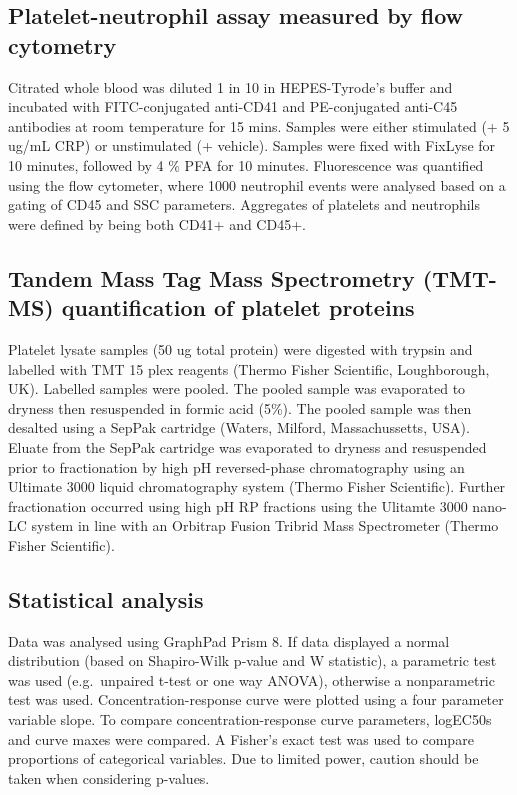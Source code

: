\documentclass[11pt,twoside]{bristolthesis}
\begin{document}
\hypertarget{platelet-neutrophil-assay-measured-by-flow-cytometry}{%
\subsection{Platelet-neutrophil assay measured by flow cytometry}\label{platelet-neutrophil-assay-measured-by-flow-cytometry}}

Citrated whole blood was diluted 1 in 10 in HEPES-Tyrode's buffer and incubated with FITC-conjugated anti-CD41 and PE-conjugated anti-C45 antibodies at room temperature for 15 mins. Samples were either stimulated (+ 5 ug/mL CRP) or unstimulated (+ vehicle). Samples were fixed with FixLyse for 10 minutes, followed by 4 \% PFA for 10 minutes. Fluorescence was quantified using the flow cytometer, where 1000 neutrophil events were analysed based on a gating of CD45 and SSC parameters. Aggregates of platelets and neutrophils were defined by being both CD41+ and CD45+.

\hypertarget{tandem-mass-tag-mass-spectrometry-tmt-ms-quantification-of-platelet-proteins}{%
\subsection{Tandem Mass Tag Mass Spectrometry (TMT-MS) quantification of platelet proteins}\label{tandem-mass-tag-mass-spectrometry-tmt-ms-quantification-of-platelet-proteins}}

Platelet lysate samples (50 ug total protein) were digested with trypsin and labelled with TMT 15 plex reagents (Thermo Fisher Scientific, Loughborough, UK). Labelled samples were pooled. The pooled sample was evaporated to dryness then resuspended in formic acid (5\%). The pooled sample was then desalted using a SepPak cartridge (Waters, Milford, Massachussetts, USA). Eluate from the SepPak cartridge was evaporated to dryness and resuspended prior to fractionation by high pH reversed-phase chromatography using an Ultimate 3000 liquid chromatography system (Thermo Fisher Scientific). Further fractionation occurred using high pH RP fractions using the Ulitamte 3000 nano-LC system in line with an Orbitrap Fusion Tribrid Mass Spectrometer (Thermo Fisher Scientific).

\hypertarget{statistical-analysis-1}{%
\subsection{Statistical analysis}\label{statistical-analysis-1}}

Data was analysed using GraphPad Prism 8. If data displayed a normal distribution (based on Shapiro-Wilk p-value and W statistic), a parametric test was used (e.g.~unpaired t-test or one way ANOVA), otherwise a nonparametric test was used. Concentration-response curve were plotted using a four parameter variable slope. To compare concentration-response curve parameters, logEC50s and curve maxes were compared. A Fisher's exact test was used to compare proportions of categorical variables. Due to limited power, caution should be taken when considering p-values.
\end{document}

